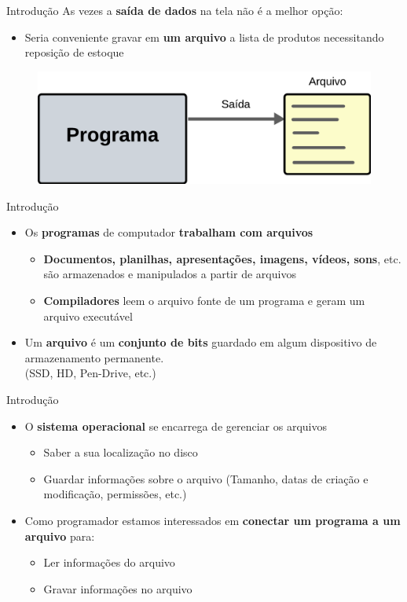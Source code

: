 \begin{frame}{Introdução}
As vezes a \textbf{saída de dados} na tela não é a melhor opção:
\begin{itemize}
    \item Seria conveniente gravar em \textbf{um arquivo} a lista de produtos necessitando reposição de estoque
\end{itemize}
    \begin{figure}
        \centering
        \includegraphics[width=0.75\linewidth]{figuras/arqpro.png}
    \end{figure}
\end{frame}

\begin{frame}{Introdução}
\begin{itemize}
    \item Os \textbf{programas} de computador \textbf{trabalham com arquivos}
    \begin{itemize}
        \item \textbf{Documentos, planilhas, apresentações, imagens, vídeos, sons}, etc.
são armazenados e manipulados a partir de arquivos
        \item \textbf{Compiladores} leem o arquivo fonte de um programa e
geram um arquivo executável
    \end{itemize}
    \item Um \textbf{arquivo} é um \textbf{conjunto de bits} guardado em algum dispositivo de armazenamento permanente. \\(SSD, HD, Pen-Drive, etc.)
\end{itemize}
    
\end{frame}


\begin{frame}{Introdução}
\begin{itemize}
    \item O \textbf{sistema operacional} se encarrega de gerenciar os arquivos
    \begin{itemize}
        \item Saber a sua localização no disco
        \item Guardar informações sobre o arquivo (Tamanho, datas de criação e modificação, permissões, etc.)
    \end{itemize}
    \item Como programador estamos interessados em \textbf{conectar um programa a um arquivo} para:
    \begin{itemize}
        \item Ler informações do arquivo
        \item Gravar informações no arquivo
    \end{itemize}
\end{itemize}
    
\end{frame}

